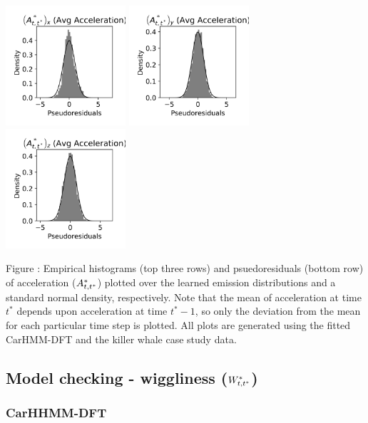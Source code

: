 \documentclass{article}
\begin{document}
\begin{center}
        \includegraphics[width=1.75in]{../Plots/CarHMM_psedoresids_Ax.png}
        \includegraphics[width=1.75in]{../Plots/CarHMM_psedoresids_Ay.png}
        \includegraphics[width=1.75in]{../Plots/CarHMM_psedoresids_Az.png}
        \end{center}
        
        \noindent Figure : Empirical histograms (top three rows) and psuedoresiduals (bottom row) of acceleration ($A^*_{t,t^*}$) plotted over the learned emission distributions and a standard normal density, respectively. Note that the mean of acceleration at time $t^*$ depends upon acceleration at time $t^*-1$, so only the deviation from the mean for each particular time step is plotted. All plots are generated using the fitted CarHMM-DFT and the killer whale case study data.
        \addtocounter{fignum}{1}
        
    \subsection{Model checking - wiggliness ($W^*_{t,t^*}$)}
        
        \subsubsection{CarHHMM-DFT}
        
\end{document}
